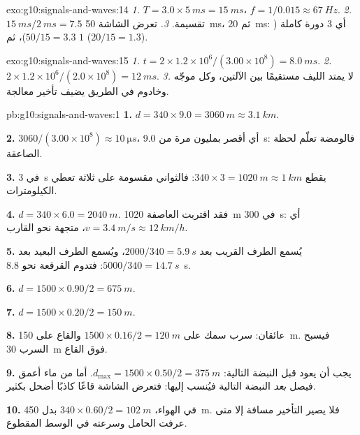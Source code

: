 \begin{solution}{exo:g10:signals-and-waves:14}
\emph{1.} $T = 3.0 \times \qty{5}{ms} = \qty{15}{ms}$،
$f = 1/0.015 \approx \qty{67}{Hz}$.
\emph{2.} $\qty{15}{ms}/\qty{2}{ms} = 7.5$ تقسيمة.
\emph{3.} تعرض الشاشة \qty{50}{ms}، ثم \qty{20}{ms}: أي $3$ دورة
كاملة ($50/15 = 3.3$)، ثم $1$ ($20/15 = 1.3$).
\end{solution}

\begin{solution}{exo:g10:signals-and-waves:15}
\emph{1.} $t = 2 \times 1.2\times10^{6}/(3.00\times10^{8}) =
\qty{8.0}{ms}$.
\emph{2.} $2 \times 1.2\times10^{6}/(2.0\times10^{8}) = \qty{12}{ms}$.
\emph{3.} لا يمتد الليف مستقيمًا بين الآلتين، وكل
موجّه وخادوم في الطريق يضيف تأخير معالجة.
\end{solution}

\begin{solution}{pb:g10:signals-and-waves:1}
\textbf{1.} $d = 340 \times 9.0 = \qty{3060}{m} \approx \qty{3.1}{km}$.

\textbf{2.} $3060/(3.00\times10^{8}) \approx \qty{10}{\micro s}$، أي أقصر
بمليون مرة من \qty{9.0}{s}: فالومضة تعلّم لحظة
الصاعقة.

\textbf{3.} في \qty{3}{s} يقطع  $340 \times 3 = \qty{1020}{m}
\approx \qty{1}{km}$: فالثواني مقسومة على ثلاثة تعطي الكيلومترات.

\textbf{4.} $d = 340 \times 6.0 = \qty{2040}{m}$. فقد اقتربت العاصفة
\qty{1020}{m} في \qty{300}{s}: أي $v = \qty{3.4}{m/s} \approx
\qty{12}{km/h}$، متجهة نحو القارب.

\textbf{5.} يُسمع الطرف القريب بعد $2000/340 = \qty{5.9}{s}$، ويُسمع الطرف
البعيد بعد $5000/340 = \qty{14.7}{s}$: فتدوم القرقعة نحو
\qty{8.8}{s}.

\textbf{6.} $d = 1500 \times 0.90/2 = \qty{675}{m}$.

\textbf{7.} $d = 1500 \times 0.20/2 = \qty{150}{m}$.

\textbf{8.} عائقان: سرب سمك على $1500 \times 0.16/2 =
\qty{120}{m}$ والقاع على \qty{150}{m}. فيسبح السرب
\qty{30}{m} فوق القاع.

\textbf{9.} يجب أن يعود  قبل النبضة التالية:
$d_{\max} = 1500 \times 0.50/2 = \qty{375}{m}$. أما من ماء أعمق فيصل
 \emph{بعد} النبضة التالية فيُنسب إليها: فتعرض
الشاشة قاعًا كاذبًا أضحل بكثير.

\textbf{10.} في الهواء، $340 \times 0.60/2 = \qty{102}{m}$ بدل
\qty{450}{m}. فلا يصير التأخير مسافة إلا متى عرفت الحامل
وسرعته في الوسط المقطوع.


\end{solution}

